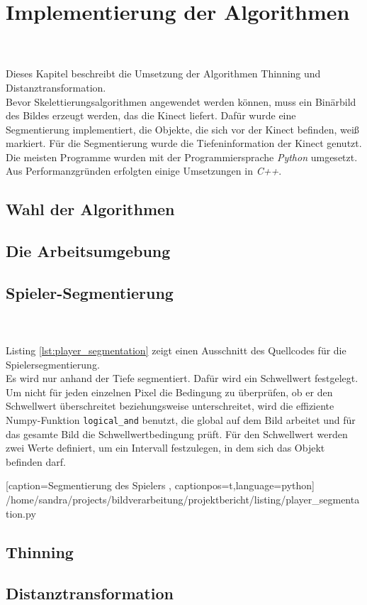 \chapter{Implementierung der Algorithmen}
\\\\
Dieses Kapitel beschreibt die Umsetzung der Algorithmen Thinning und Distanztransformation.\\
Bevor Skelettierungsalgorithmen angewendet werden können, muss ein Binärbild des Bildes erzeugt werden, 
das die Kinect liefert. Dafür wurde eine Segmentierung implementiert, die Objekte, die sich vor der
Kinect befinden, weiß markiert. Für die Segmentierung wurde die Tiefeninformation der Kinect genutzt.\\
Die meisten Programme wurden mit der Programmiersprache \emph{Python} umgesetzt. Aus Performanzgründen 
erfolgten einige Umsetzungen in \emph{C++}. 
\section{Wahl der Algorithmen}
\section{Die Arbeitsumgebung}
\section{Spieler-Segmentierung}
\\\\
Listing \ref{lst:player_segmentation} zeigt einen Ausschnitt des Quellcodes für die Spielersegmentierung.\\
Es wird nur anhand der Tiefe segmentiert. Dafür wird ein Schwellwert festgelegt. Um nicht für jeden einzelnen Pixel die Bedingung zu überprüfen, ob er den Schwellwert überschreitet beziehungsweise unterschreitet, wird die effiziente Numpy-Funktion \texttt{logical\_and} benutzt, die global auf dem Bild arbeitet und für das gesamte Bild die Schwellwertbedingung prüft. Für den Schwellwert werden zwei 
Werte definiert, um ein Intervall festzulegen, in dem sich das Objekt befinden darf. 

    [caption={Segmentierung des Spielers}
       \label{lst:player_segmentation},
       captionpos=t,language=python]
 {/home/sandra/projects/bildverarbeitung/projektbericht/listing/player_segmentation.py}
\section{Thinning}  %
\section{Distanztransformation}
